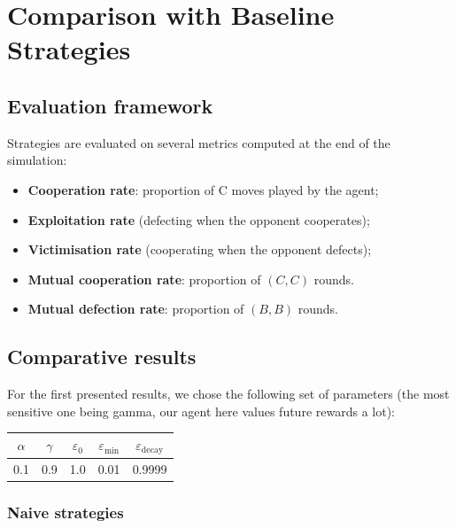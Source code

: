 \documentclass[11pt, a4paper]{article}
\begin{document}
\section{Comparison with Baseline Strategies}
\label{sec:baselines}

\subsection{Evaluation framework}

Strategies are evaluated on several metrics computed at the end of the simulation:
\begin{itemize}
  \item \textbf{Cooperation rate}: proportion of C moves played by the agent;
  \item \textbf{Exploitation rate} (defecting when the opponent cooperates);
  \item \textbf{Victimisation rate} (cooperating when the opponent defects);
  \item \textbf{Mutual cooperation rate}: proportion of $(C, C)$ rounds.
  \item \textbf{Mutual defection rate}: proportion of $(B, B)$ rounds.
\end{itemize}

\subsection{Comparative results}

For the first presented results, we chose the following set of parameters (the most sensitive one being gamma, our agent here values future rewards a lot):
\begin{center}
  \begin{tabular}{ccccc}
    \toprule
    $\alpha$ & $\gamma$ & $\varepsilon_0$ & $\varepsilon_{\min}$ & $\varepsilon_{\text{decay}}$ \\
    \midrule
    0.1 & 0.9 & 1.0 & 0.01 & 0.9999 \\
    \bottomrule
  \end{tabular}
\end{center}

\subsubsection{Naive strategies}
\end{document}
